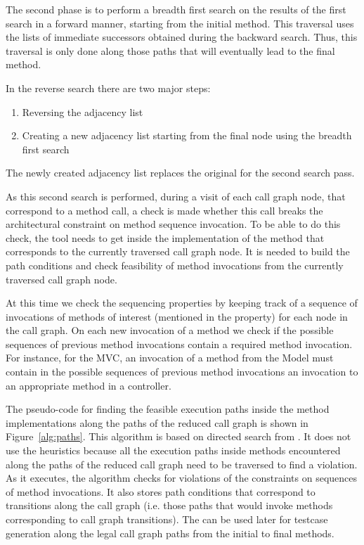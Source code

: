\documentclass{acm_proc_article-sp}
\begin{document}
The second phase is to perform a breadth first search on the results
of the first search in a forward manner, starting from the initial
method.  This traversal uses the lists of immediate successors
obtained during the backward search.  Thus, this traversal is only
done along those paths that will eventually lead to the final method.

In the reverse search there are two major steps:
\begin{enumerate}
\item	Reversing the adjacency list
\item	Creating a new adjacency list starting from the final node using the breadth first search
\end{enumerate}
The newly created adjacency list replaces the original for the second search pass.


As this second search is performed, during a visit of each call graph node, that correspond to a method call, a check is made whether this call breaks the architectural constraint on method sequence invocation. To be able to do this check, the tool needs to get inside the implementation of the method that corresponds to the currently traversed call graph node. It is needed to build the path conditions and check feasibility of method invocations from the currently traversed call graph node.

At this time we check the sequencing properties by keeping track of a sequence of invocations of methods of interest (mentioned in the property) for each node in the call graph. On each new invocation of a method we check if the possible sequences of previous method invocations contain a required method invocation. For instance, for the MVC, an invocation of a method from the Model must contain in the possible sequences of previous method invocations an invocation to an appropriate method in a controller.

The pseudo-code for finding the feasible execution paths inside the method implementations along the paths of the reduced call graph is shown in Figure~\ref{alg:paths}. This algorithm is based on directed search from \cite{Ma:2011}. It does not use the heuristics because all the execution paths inside methods encountered along the paths of the reduced call graph need to be traversed to find a violation. As it executes, the algorithm checks for violations of the constraints on sequences of method invocations. It also stores path conditions that correspond to transitions along the call graph (i.e. those paths that would invoke methods corresponding to call graph transitions). The can be used later for testcase generation along the legal call graph paths from the initial to final methods.
\end{document}

